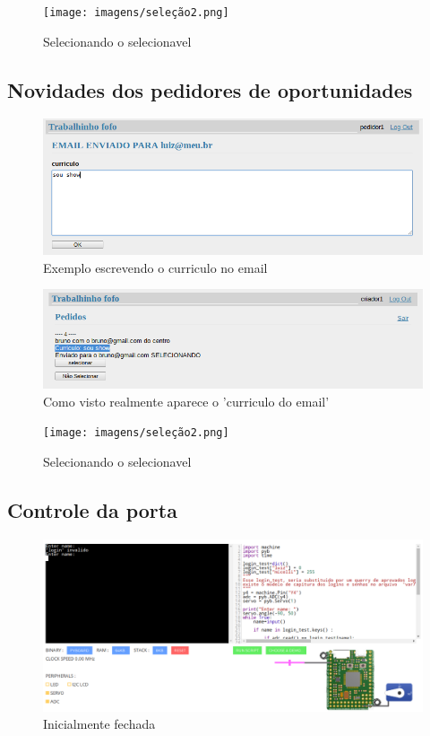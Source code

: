 \documentclass[12pt]{article}
\begin{document}
\begin{figure}[ht]
\centering
\texttt{[image: imagens/seleção2.png]}
\caption{Selecionando o selecionavel}
\end{figure}

\clearpage
\subsection{Novidades dos pedidores de oportunidades}

\begin{figure}[ht]
\centering
\includegraphics[width=.5\textwidth]{imagens/email.png}
\caption{Exemplo escrevendo o curriculo no email}
\end{figure}

\begin{figure}[ht]
\centering
\includegraphics[width=.5\textwidth]{imagens/curriculo.png}
\caption{Como visto realmente aparece o 'curriculo do email'}
\end{figure}


\begin{figure}[ht]
\centering
\texttt{[image: imagens/seleção2.png]}
\caption{Selecionando o selecionavel}
\end{figure}

\clearpage
\subsection{Controle da porta}

\begin{figure}[ht]
\centering
\includegraphics[width=.5\textwidth]{imagens/fechada.png}
\caption{Inicialmente fechada}
\end{figure}
\end{document}
